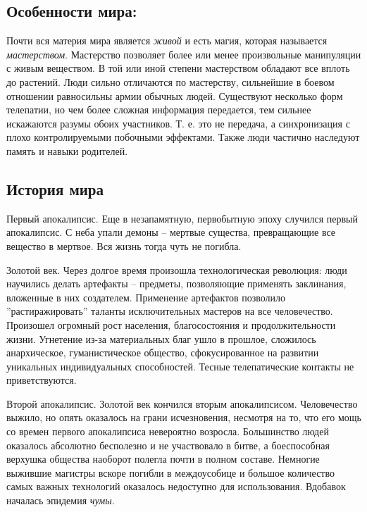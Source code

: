 \documentclass[12pt,a4paper]{article}
\begin{document}
\pagestyle{empty}

\subsection*{Особенности мира:}

Почти вся материя мира является \textit{живой} и есть магия, которая называется \textit{мастерством}. Мастерство позволяет более или менее произвольные манипуляции с живым веществом. В той или иной степени мастерством обладают все вплоть до растений. Люди сильно отличаются по мастерству, сильнейшие в боевом отношении равносильны армии обычных людей.
Существуют несколько форм телепатии, но чем более сложная информация передается, тем сильнее искажаются разумы обоих участников. Т. е. это не передача, а синхронизация с плохо контролируемыми побочными эффектами.
Также люди частично наследуют память и навыки родителей.

\subsection*{История мира}
Первый апокалипсис. Еще в незапамятную, первобытную эпоху случился первый апокалипсис. С неба упали демоны -- мертвые существа, превращающие все вещество в мертвое. Вся жизнь тогда чуть не погибла.

Золотой век. Через долгое время произошла технологическая революция: люди научились делать артефакты -- предметы, позволяющие применять заклинания, вложенные в них создателем. Применение артефактов позволило ''растиражировать'' таланты исключительных мастеров на все человечество. Произошел огромный рост населения, благосостояния и продолжительности жизни. Угнетение из-за материальных благ ушло в прошлое, сложилось анархическое, гуманистическое общество, сфокусированное на развитии уникальных индивидуальных способностей. Тесные телепатические контакты не приветствуются.

Второй апокалипсис. Золотой век кончился вторым апокалипсисом. Человечество выжило, но опять оказалось на грани исчезновения, несмотря на то, что его мощь со времен первого апокалипсиса невероятно возросла. Большинство людей оказалось абсолютно бесполезно и не участвовало в битве, а боеспособная верхушка общества наоборот полегла почти в полном составе. Немногие выжившие магистры вскоре погибли в междоусобице и большое количество самых важных технологий оказалось недоступно для использования. Вдобавок началась эпидемия \textit{чумы}. 
\end{document}
